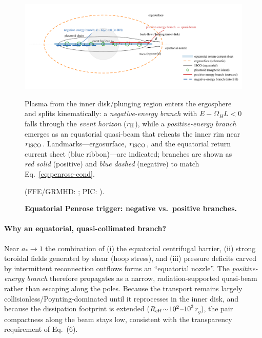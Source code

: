 \documentclass[twocolumn]{aastex701}
\begin{document}
\begin{figure}[p!]
  \centering
  \includegraphics[width=\textwidth]{fig_equatorial_trigger_schematic.pdf}
  \caption{\textbf{Equatorial Penrose trigger: negative vs.\ positive branches.}}
  Plasma from the inner disk/plunging region enters the ergosphere and splits kinematically:
  a \emph{negative-energy branch} with $E-\Omega_H L<0$ falls through the \emph{event horizon} ($r_{\rm H}$),
  while a \emph{positive-energy branch} emerges as an equatorial quasi-beam that reheats the inner rim near $r_{\rm ISCO}$.
  Landmarks—ergosurface, $r_{\rm ISCO}$, and the equatorial return current sheet (blue ribbon)—are indicated; branches are shown as \emph{red solid} (positive) and \emph{blue dashed} (negative) to match Eq.~\eqref{eq:penrose-cond}.
  
  {\footnotesize (FFE/GRMHD: \citealt{Komissarov2004MNRAS,EastYang2018PRD,Pan2018PRD};
                  PIC: \citealt{Parfrey2019PRL,Bransgrove2021PRL}).}
  \label{fig:equatorial_trigger}
\end{figure}
\FloatBarrier

\paragraph{Why an equatorial, quasi-collimated branch?}
Near $a_*\!\to\!1$ the combination of (i) the equatorial centrifugal barrier,
(ii) strong toroidal fields generated by shear (hoop stress), and
(iii) pressure deficits carved by intermittent reconnection outflows
forms an ``equatorial nozzle''. The \emph{positive-energy branch} therefore propagates as a
narrow, radiation-supported quasi-beam rather than escaping along the poles.
Because the transport remains largely collisionless/Poynting-dominated until
it reprocesses in the inner disk, and because the dissipation footprint is
extended ($R_{\rm eff}\!\sim\!10^{2}$–$10^{3}\,r_g$), the pair compactness
along the beam stays low, consistent with the transparency requirement of Eq.~(6).
\end{document}

